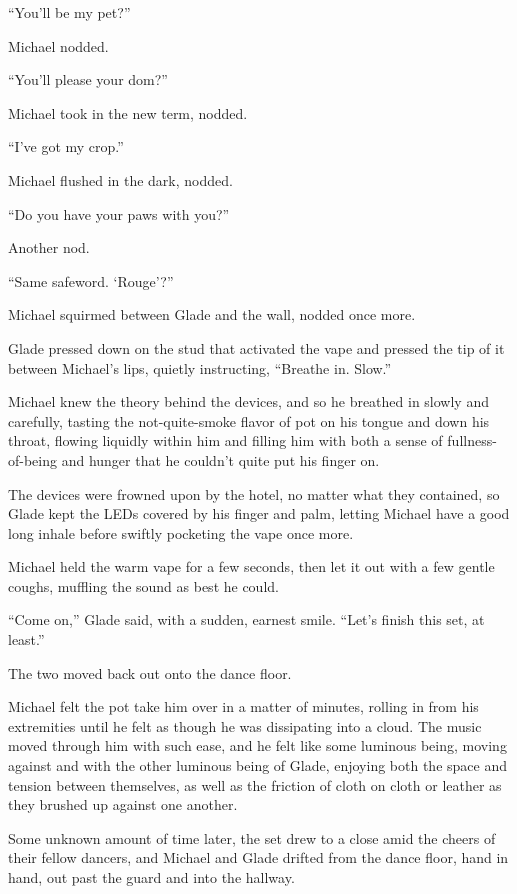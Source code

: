 ``You'll be my pet?''

Michael nodded.

``You'll please your dom?''

Michael took in the new term, nodded.

``I've got my crop.''

Michael flushed in the dark, nodded.

``Do you have your paws with you?''

Another nod.

``Same safeword.  `Rouge'?''

Michael squirmed between Glade and the wall, nodded once more.

Glade pressed down on the stud that activated the vape and pressed the tip of it between Michael's lips, quietly instructing, ``Breathe in.  Slow.''

Michael knew the theory behind the devices, and so he breathed in slowly and carefully, tasting the not-quite-smoke flavor of pot on his tongue and down his throat, flowing liquidly within him and filling him with both a sense of fullness-of-being and hunger that he couldn't quite put his finger on.

The devices were frowned upon by the hotel, no matter what they contained, so Glade kept the LEDs covered by his finger and palm, letting Michael have a good long inhale before swiftly pocketing the vape once more.

Michael held the warm vape for a few seconds, then let it out with a few gentle coughs, muffling the sound as best he could.

``Come on,'' Glade said, with a sudden, earnest smile.  ``Let's finish this set, at least.''

The two moved back out onto the dance floor.

Michael felt the pot take him over in a matter of minutes, rolling in from his extremities until he felt as though he was dissipating into a cloud.  The music moved through him with such ease, and he felt like some luminous being, moving against and with the other luminous being of Glade, enjoying both the space and tension between themselves, as well as the friction of cloth on cloth or leather as they brushed up against one another.

Some unknown amount of time later, the set drew to a close amid the cheers of their fellow dancers, and Michael and Glade drifted from the dance floor, hand in hand, out past the guard and into the hallway.


